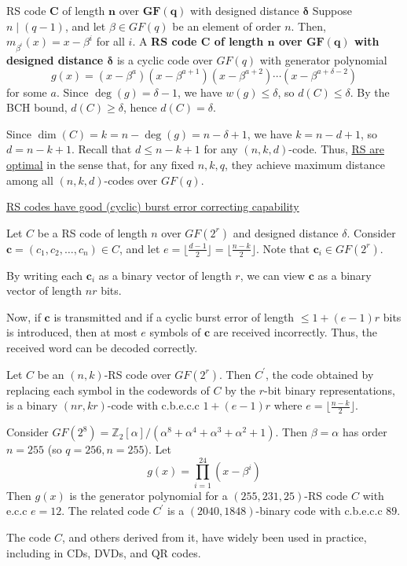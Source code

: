 \begin{Definition}{RS code $ \bm{C} $ of length $ \bm{n} $ over $ \bm{GF(q)} $
        with designed distance $ \bm{\delta} $}{}
    Suppose $ n\mid (q-1) $, and let $ \beta\in GF(q) $ be an element of order $ n $.
    Then, $ m_{\beta^i}(x)=x-\beta^i $ for all $ i $. A
    \textbf{RS code $ \bm{C} $ of length $ \bm{n} $ over $ \bm{GF(q)} $
        with designed distance $ \bm{\delta} $} is a cyclic code over $ GF(q) $
    with generator polynomial
    \[ g(x)=(x-\beta^{a})(x-\beta^{a+1})(x-\beta^{a+2})\cdots
        (x-\beta^{a+\delta-2}) \]
    for some $ a $. Since $ \deg(g)=\delta-1 $, we have $ w(g)\leqslant \delta $,
    so $ d(C)\leqslant \delta $. By the BCH bound, $ d(C)\geqslant \delta $,
    hence $ d(C)=\delta $.

    Since $ \dim(C)=k=n-\deg(g)=n-\delta+1 $, we have $ k=n-d+1 $,
    so $ d=n-k+1 $. Recall that $ d\leqslant n-k+1 $ for any $ (n,k,d) $-code.
    Thus, \underline{RS are optimal} in the sense that, for any fixed $ n,k,q $,
    they achieve maximum distance among all $ (n,k,d) $-codes over $ GF(q) $.
\end{Definition}

\underline{RS codes have good (cyclic) burst error correcting capability}

Let $ C $ be a RS code of length $ n $ over $ GF(2^r) $ and designed
distance $ \delta $. Consider $ \bm{c}=(c_1,c_2,\ldots ,c_n)\in C $,
and let $ e=\lfloor\frac{d-1}{2} \rfloor =\lfloor\frac{n-k}{2} \rfloor $.
Note that $ \bm{c}_i\in GF(2^r) $.

By writing each $ \bm{c}_i $ as a binary vector of length
$ r $, we can view $ \bm{c} $ as a binary vector of length $ nr $ bits.

Now, if $ \bm{c} $ is transmitted and if a cyclic burst error of length
$ \leqslant 1+(e-1)r $ bits is introduced, then at most $ e $
symbols of $ \bm{c} $ are received incorrectly. Thus, the received
word can be decoded correctly.

\begin{Theorem}{}{}
    Let $ C $ be an $ (n,k) $-RS code over $ GF(2^r) $. Then
    $ C^{\prime} $, the code obtained by replacing each symbol
    in the codewords of $ C $ by the $ r $-bit binary representations,
    is a binary $ (nr,kr) $-code with c.b.e.c.c $ 1+(e-1)r $
    where $ e=\lfloor \frac{n-k}{2} \rfloor $.
\end{Theorem}

\begin{Example}{}{}
    Consider $ GF(2^8)=\mathbb{Z}_2[\alpha]/(\alpha^8+\alpha^4+\alpha^3+\alpha^2+1) $.
    Then $ \beta=\alpha $ has order $ n=255 $ (so $ q=256,n=255 $).
    Let
    \[ g(x)=\prod_{i=1}^{24}(x-\beta^i) \]
    Then $ g(x) $ is the generator polynomial for a $ (255,231,25) $-RS
    code $ C $ with e.c.c $ e=12 $. The related code $ C^{\prime} $
    is a $ (2040,1848) $-binary code with c.b.e.c.c $ 89 $.
\end{Example}

The code $ C $, and others derived from it, have widely been used in practice,
including in CDs, DVDs, and QR codes.
